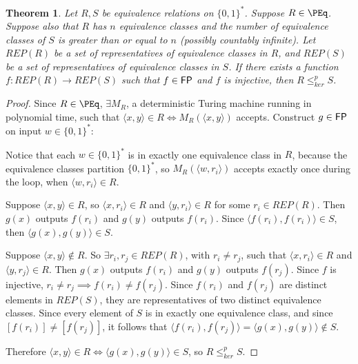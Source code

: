 \documentclass{article}
\newtheorem{theorem}{Theorem}[section]
\theoremstyle{definition} \newtheorem{definition}[definition]{Definition}
\newcommand{\sigmastar}{\{0, 1\}^{*}} %
\newcommand{\kr}{\leq^{p}_{ker}} %
\newcommand{\pair}[2]{\langle#1,#2\rangle} %
\begin{document}
\begin{theorem}\label{thm:repr_kr}
  Let $R,S$ be equivalence relations on $\sigmastar$. Suppose
  $R\in\PEq$. Suppose also that $R$ has $n$ equivalence classes and the number
  of equivalence classes of $S$ is greater than or equal to $n$ (possibly
  countably infinite). Let $REP(R)$ be a set of representatives of equivalence
  classes in $R$, and $REP(S)$ be a set of representatives of equivalence
  classes in $S$. If there exists a function $f\colon REP(R)\to REP(S)$ such
  that $f\in{\ensuremath{\mathsf{FP}}}$ and $f$ is injective, then $R\kr S$.
\end{theorem}
\begin{proof}
  Since $R\in\PEq$, $\exists M_R$, a deterministic Turing machine running in
  polynomial time, such that $\pair{x}{y}\in R\iff M_R(\pair{x}{y})$
  accepts. Construct $g\in{\ensuremath{\mathsf{FP}}}$ on input $w\in\sigmastar$:\\
  \begin{algorithm}[H]
    \For{$r_i\in REP(R)$}{
      \If{$M_R(\pair{w}{r_i})$ accepts}{
        \Return{$f(r_i)$}
      }
    }
  \end{algorithm}
  Notice that each $w\in\sigmastar$ is in exactly one equivalence class in $R$,
  because the equivalence classes partition $\sigmastar$, so
  $M_R(\pair{w}{r_i})$ accepts exactly once during the loop, when
  $\pair{w}{r_i}\in R$.

  Suppose $\pair{x}{y}\in R$, so $\pair{x}{r_i}\in R$ and $\pair{y}{r_i}\in R$
  for some $r_i\in REP(R)$. Then $g(x)$ outputs $f(r_i)$ and $g(y)$ outputs
  $f(r_i)$. Since $\pair{f(r_i)}{f(r_i)}\in S$, then $\pair{g(x)}{g(y)}\in S$.

  Suppose $\pair{x}{y}\notin R$. So $\exists r_i, r_j\in REP(R)$, with $r_i\neq
  r_j$, such that $\pair{x}{r_i}\in R$ and $\pair{y}{r_j}\in R$. Then $g(x)$
  outputs $f(r_i)$ and $g(y)$ outputs $f(r_j)$. Since $f$ is injective,
  $r_i\neq r_j\implies f(r_i)\neq f(r_j)$. Since $f(r_i)$ and $f(r_j)$ are
  distinct elements in $REP(S)$, they are representatives of two distinct
  equivalence classes. Since every element of $S$ is in exactly one equivalence
  class, and since $[f(r_i)]\neq[f(r_j)]$, it follows that
  $\pair{f(r_i)}{f(r_j)}=\pair{g(x)}{g(y)}\notin S$.

  Therefore $\pair{x}{y}\in R\iff \pair{g(x)}{g(y)}\in S$, so $R\kr S$.
\end{proof}
\end{document}
